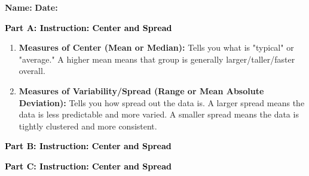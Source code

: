 \documentclass[12pt, letterpaper, fleqn]{article}
\begin{document}
\textbf{Name:} \underline{\hspace{5cm}}
\hfill
\textbf{Date:} \underline{\hspace{3cm}}\\

\begin{tcolorbox}[colback=customteal!20]
\large\textcolor{black}{\textbf{Part A: Instruction: Center and Spread}}
\end{tcolorbox}

\vspace{3mm}

\begin{enumerate}[itemsep=2.2cm, leftmargin=0.6cm]
\item \textbf{Measures of Center (Mean or Median):} Tells you what is "typical" or "average." A higher mean means that group is generally larger/taller/faster overall.
\item \textbf{Measures of Variability/Spread (Range or Mean Absolute Deviation):} Tells you how spread out the data is. A larger spread means the data is less predictable and more varied. A smaller spread means the data is tightly clustered and more consistent.
\end{enumerate}

\newpage

\begin{tcolorbox}[colback=customteal!20]
\large\textcolor{black}{\textbf{Part B: Instruction: Center and Spread}}
\end{tcolorbox}

\vspace{3mm}


\newpage

\begin{tcolorbox}[colback=customteal!20]
\large\textcolor{black}{\textbf{Part C: Instruction: Center and Spread}}
\end{tcolorbox}
\end{document}

